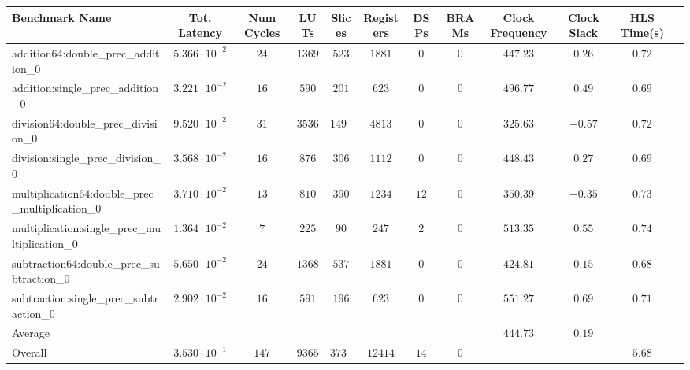 \begin{tabular}{|l|c|c|c|c|c|c|c|c|c|c|c|}
\hline
Benchmark Name                                   & Tot. Latency            & Num Cycles & LUTs     & Slices   & Registers & DSPs   & BRAMs & Clock Frequency & Clock Slack & HLS Time(s) \\
\hline
addition64:double\_prec\_addition\_0             & $ 5.366 \cdot 10^{-2} $ & $ 24     $ & $ 1369 $ & $ 523  $ & $ 1881  $ & $ 0  $ & $ 0 $ & $ 447.23      $ & $ 0.26    $ & $ 0.72    $ \\
addition:single\_prec\_addition\_0               & $ 3.221 \cdot 10^{-2} $ & $ 16     $ & $ 590  $ & $ 201  $ & $ 623   $ & $ 0  $ & $ 0 $ & $ 496.77      $ & $ 0.49    $ & $ 0.69    $ \\
division64:double\_prec\_division\_0             & $ 9.520 \cdot 10^{-2} $ & $ 31     $ & $ 3536 $ & $ 1494 $ & $ 4813  $ & $ 0  $ & $ 0 $ & $ 325.63      $ & $ -0.57   $ & $ 0.72    $ \\
division:single\_prec\_division\_0               & $ 3.568 \cdot 10^{-2} $ & $ 16     $ & $ 876  $ & $ 306  $ & $ 1112  $ & $ 0  $ & $ 0 $ & $ 448.43      $ & $ 0.27    $ & $ 0.69    $ \\
multiplication64:double\_prec\_multiplication\_0 & $ 3.710 \cdot 10^{-2} $ & $ 13     $ & $ 810  $ & $ 390  $ & $ 1234  $ & $ 12 $ & $ 0 $ & $ 350.39      $ & $ -0.35   $ & $ 0.73    $ \\
multiplication:single\_prec\_multiplication\_0   & $ 1.364 \cdot 10^{-2} $ & $ 7      $ & $ 225  $ & $ 90   $ & $ 247   $ & $ 2  $ & $ 0 $ & $ 513.35      $ & $ 0.55    $ & $ 0.74    $ \\
subtraction64:double\_prec\_subtraction\_0       & $ 5.650 \cdot 10^{-2} $ & $ 24     $ & $ 1368 $ & $ 537  $ & $ 1881  $ & $ 0  $ & $ 0 $ & $ 424.81      $ & $ 0.15    $ & $ 0.68    $ \\
subtraction:single\_prec\_subtraction\_0         & $ 2.902 \cdot 10^{-2} $ & $ 16     $ & $ 591  $ & $ 196  $ & $ 623   $ & $ 0  $ & $ 0 $ & $ 551.27      $ & $ 0.69    $ & $ 0.71    $ \\
\hline
Average                                          & $                     $ & $        $ & $      $ & $      $ & $       $ & $    $ & $   $ & $ 444.73      $ & $ 0.19    $ & $         $ \\
\hline
Overall                                          & $ 3.530 \cdot 10^{-1} $ & $ 147    $ & $ 9365 $ & $ 3737 $ & $ 12414 $ & $ 14 $ & $ 0 $ & $             $ & $         $ & $ 5.68    $ \\
\hline
\end{tabular}
